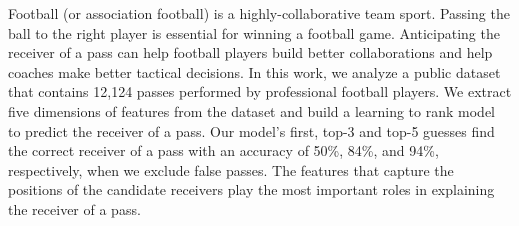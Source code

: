 Football (or association football) is a highly-collaborative team sport. 
Passing the ball to the right player is essential for winning a football game.
Anticipating the receiver of a pass can help football players build better collaborations and help coaches make better tactical decisions.
In this work, we analyze a public dataset that contains 12,124 passes performed by professional football players.
We extract five dimensions of features from the dataset and build a learning to rank model to predict the receiver of a pass. 
Our model's first, top-3 and top-5 guesses find the correct receiver of a pass with an accuracy of 50\%, 84\%, and 94\%, respectively, when we exclude false passes.
The features that capture the positions of the candidate receivers play the most important roles in explaining the receiver of a pass.

